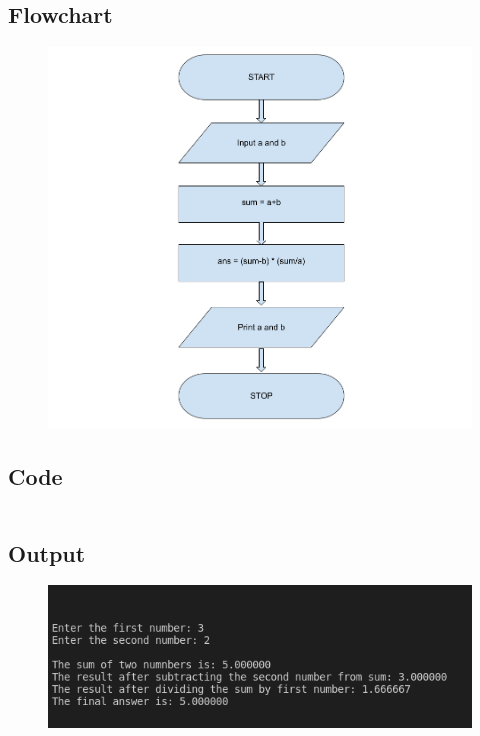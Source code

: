 \documentclass[12pt]{article}
\begin{document}
\subsection{Flowchart}
\begin{figure}[h]
    \centering
    \includegraphics[width=1.0\textwidth]{Flowchart02.png}
\end{figure}
\newpage
\subsection{Code}
\inputminted{c}{q2.c}
\subsection{Output}
\begin{figure}[h]
    \centering
    \includegraphics[width=1.0\textwidth]{2.png}
\end{figure}
\newpage
\section{}
\end{document}
